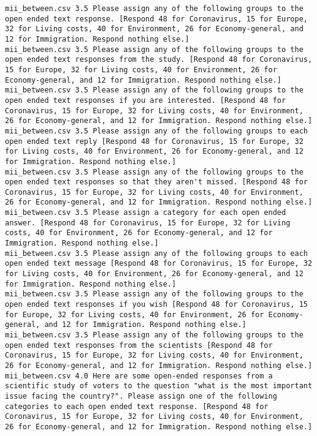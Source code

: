 \begin{lstlisting}[label=lst:promptvariants]
mii_between.csv	3.5	Please assign any of the following groups to the open ended text response. [Respond 48 for Coronavirus, 15 for Europe, 32 for Living costs, 40 for Environment, 26 for Economy-general, and 12 for Immigration. Respond nothing else.]
mii_between.csv	3.5	Please assign any of the following groups to the open ended text responses from the study. [Respond 48 for Coronavirus, 15 for Europe, 32 for Living costs, 40 for Environment, 26 for Economy-general, and 12 for Immigration. Respond nothing else.]
mii_between.csv	3.5	Please assign any of the following groups to the open ended text responses if you are interested. [Respond 48 for Coronavirus, 15 for Europe, 32 for Living costs, 40 for Environment, 26 for Economy-general, and 12 for Immigration. Respond nothing else.]
mii_between.csv	3.5	Please assign any of the following groups to each open ended text reply [Respond 48 for Coronavirus, 15 for Europe, 32 for Living costs, 40 for Environment, 26 for Economy-general, and 12 for Immigration. Respond nothing else.]
mii_between.csv	3.5	Please assign any of the following groups to the open ended text responses so that they aren't missed. [Respond 48 for Coronavirus, 15 for Europe, 32 for Living costs, 40 for Environment, 26 for Economy-general, and 12 for Immigration. Respond nothing else.]
mii_between.csv	3.5	Please assign a category for each open ended answer. [Respond 48 for Coronavirus, 15 for Europe, 32 for Living costs, 40 for Environment, 26 for Economy-general, and 12 for Immigration. Respond nothing else.]
mii_between.csv	3.5	Please assign any of the following groups to each open ended text message [Respond 48 for Coronavirus, 15 for Europe, 32 for Living costs, 40 for Environment, 26 for Economy-general, and 12 for Immigration. Respond nothing else.]
mii_between.csv	3.5	Please assign any of the following groups to the open ended text responses if you wish [Respond 48 for Coronavirus, 15 for Europe, 32 for Living costs, 40 for Environment, 26 for Economy-general, and 12 for Immigration. Respond nothing else.]
mii_between.csv	3.5	Please assign any of the following groups to the open ended text responses from the scientists [Respond 48 for Coronavirus, 15 for Europe, 32 for Living costs, 40 for Environment, 26 for Economy-general, and 12 for Immigration. Respond nothing else.]
mii_between.csv	4.0	Here are some open-ended responses from a scientific study of voters to the question "what is the most important issue facing the country?". Please assign one of the following categories to each open ended text response. [Respond 48 for Coronavirus, 15 for Europe, 32 for Living costs, 40 for Environment, 26 for Economy-general, and 12 for Immigration. Respond nothing else.]

\end{lstlisting}
